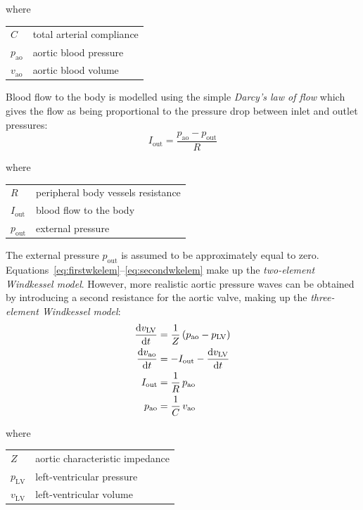 \noindent
where

\vspace{0.2cm}
\begin{tabular}{ll}
    $C$ & total arterial compliance \\
    $p_{\textrm{ao}}$ & aortic blood pressure \\
    $v_{\textrm{ao}}$ & aortic blood volume \\
\end{tabular}

\vspace{0.2cm}\noindent
Blood flow to the body is modelled using the simple \textit{Darcy's law of flow} which gives the flow as being proportional to the pressure drop between inlet and outlet pressures:
%
\begin{equation}\label{eq:secondwkelem}
    I_{\textrm{out}} = \frac{p_{\textrm{ao}}-p_{\textrm{out}}}{R} 
\end{equation}

\noindent
where

\vspace{0.2cm}
\begin{tabular}{ll}
    $R$ & peripheral body vessels resistance \\
    $I_{\textrm{out}}$ & blood flow to the body \\
    $p_{\textrm{out}}$ & external pressure \\
\end{tabular}

\vspace{0.2cm}\noindent
The external pressure $p_{\textrm{out}}$ is assumed to be approximately equal to zero. Equations~\eqref{eq:firstwkelem}--\eqref{eq:secondwkelem} make up the \textit{two-element Windkessel model}. However, more realistic aortic pressure waves can be obtained by introducing a second resistance for the aortic valve, making up the \textit{three-element Windkessel model}:
%
\begin{align}\label{eq:windk}
    \dfrac{\mathrm{d}{v_{\textrm{LV}}}}{\mathrm{d}{t}} &= \frac{1}{Z}\,(p_{\textrm{ao}}-p_{\textrm{LV}}) \\ 
    \dfrac{\mathrm{d}{v_{\textrm{ao}}}}{\mathrm{d}{t}} &= -I_{\textrm{out}}-\dfrac{\mathrm{d}{v_{\textrm{LV}}}}{\mathrm{d}{t}} \\
    I_{\textrm{out}} &= \frac{1}{R}\,p_{\textrm{ao}} \\
    p_{\textrm{ao}} &= \frac{1}{C}\,v_{\textrm{ao}}
\end{align}

\noindent
where

\vspace{0.2cm}
\begin{tabular}{ll}
    $Z$ & aortic characteristic impedance \\
    $p_{\textrm{LV}}$ & left-ventricular pressure \\
    $v_{\textrm{LV}}$ & left-ventricular volume
\end{tabular}

